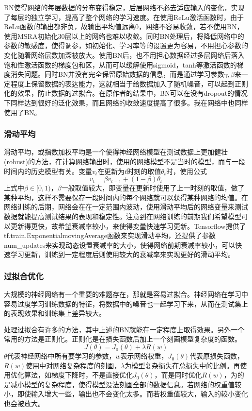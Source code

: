 \documentclass[12pt]{article}
\begin{document}
BN使得网络的每层数据的分布变得稳定，后层网络不必去适应输入的变化，实现了每层的独立学习，提高了整个网络的学习速度。在使用ReLu激活函数时，由于ReLu函数的输出都非负，故输出平均值远离0，网络不容易收敛，若不使用BN，使用MSRA初始化30层以上的网络也难以收敛\cite{bn-relu}。同时BN处理后，将降低网络中的参数的敏感度，使得调参，如初始化、学习率等的设置更为容易，不用担心参数的变化随着网络层数加深被放大。使用BN后，也不用担心数据经过多层网络后落入饱和性激活函数的梯度包和区，从而可以缓解使用sigmoid，tanh等激活函数的梯度消失问题。同时BN并没有完全保留原始数据的信息，而是通过学习参数$\gamma, \beta$来一定程度上保留数据的表达能力，这就相当于给数据加入了随机噪音，可以起到正则化的效果，防止数据的过拟合。在原作者的结果中，BN可以在没有dropout的情况下同样达到很好的泛化效果，而且网络的收敛速度提高了很多。\cite{bn}我在网络中也同样使用了BN。

\subsubsection{滑动平均}
\noindent

滑动平均，或指数加权平均是一个使得神经网络模型在测试数据上更加健壮(robust)的方法，在计算网络输出时，使用的网络模型不是当时的模型，而与一段时间内的历史模型有关。变量$v_t$在更新为$t$时刻的取值$\theta_t$时，使用公式
$$v_t = \beta v_{t-1} + (1 - \beta) \theta_t$$
上式中$\beta \in [0, 1)$，$\beta$一般取值较大，即变量在更新时使用了上一时刻的取值，做了某种平均，这样不需要保存一段时间内的每个网络就可以获得某种网络的均值。在网络训练的后期，网络会在在一定范围内波动，使用滑动平均后的网络变量来测试数据就能提高测试结果的表现和稳定性。注意到在网络训练的前期我们希望模型可以更新得更快，故希望衰减率较小，来使得变量快速学习更新。Tensorflow提供了tf.train.ExponentialmovingAverage函数来实现滑动平均，还提供了参数num\_updates来实现动态设置衰减率的大小，使得网络前期衰减率较小，可以快速学习更新，训练到一定程度后则使用较大的衰减率来实现更好的滑动平均。

\subsubsection{过拟合优化}
\noindent

大规模的神经网络有一个重要的难题存在，那就是容易过拟合。神经网络在学习中容易过度学习训练数据的特征，将数据中的噪音也一起学习下来，从而在测试集上的表现效果和训练集上差异较大。

处理过拟合有许多的方法，其中上述的BN就能在一定程度上取得效果。另外一个常用的方法是正则化。正则化是在损失函数后加上一个刻画模型复杂度的函数。
$$J(\theta) = J_0(\theta) + \lambda R(w)$$
$\theta$代表神经网络中所有要学习的参数，$w$表示网络权重，$J_0(\theta)$代表原损失函数，$R(w)$使用中对网络复杂程度的刻画，$\lambda$为模型复杂损失在总损失中的比例。再使用优化算法，如梯度下降时，不是直接优化$J_0(\theta)$，而是同时优化$R(w)$，为的是减小模型的复杂程度，使得模型没法刻画全部的数据信息。若网络的权重值较小，即使输入增大一些，输出也不会变化太多。而若权重值较大，输入的较小变化也会被放大。
\end{document}
